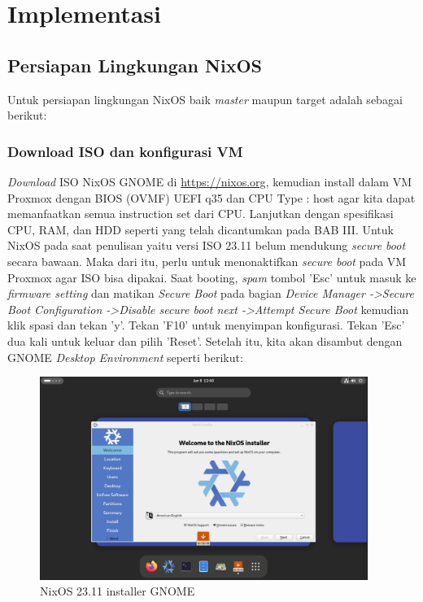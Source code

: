 \documentclass[10pt,twoside]{report}
\begin{document}
\section{Implementasi}
\begin{adjustwidth}{20pt}{}
	\subsection{Persiapan Lingkungan NixOS}
	\begin{adjustwidth}{20pt}{}
		Untuk persiapan lingkungan NixOS baik \textit{master} maupun target
		adalah sebagai berikut:
	\end{adjustwidth}
	\subsubsection{Download ISO dan konfigurasi VM}
	\begin{adjustwidth}{20pt}{}
		\textit{Download} ISO NixOS GNOME di \url{https://nixos.org}, kemudian
		install dalam VM Proxmox dengan BIOS (OVMF) UEFI q35 dan CPU Type : host
		agar kita dapat memanfaatkan semua instruction set dari CPU. Lanjutkan
		dengan spesifikasi CPU, RAM, dan HDD seperti yang telah dicantumkan pada
		BAB III. Untuk NixOS pada saat penulisan yaitu versi ISO 23.11 belum
		mendukung \textit{secure boot} secara bawaan. Maka dari itu, perlu untuk
		menonaktifkan \textit{secure boot} pada VM Proxmox agar ISO bisa dipakai.
		Saat booting, \textit{spam} tombol 'Esc' untuk masuk ke \textit{firmware setting} dan
		matikan \textit{Secure Boot} pada bagian \textit{Device Manager
			-\textgreater Secure Boot Configuration -\textgreater Disable secure boot
			next -\textgreater Attempt Secure Boot} kemudian klik spasi dan tekan 'y'.
		Tekan 'F10' untuk menyimpan konfigurasi. Tekan 'Esc' dua kali untuk keluar
		dan pilih 'Reset'. Setelah itu, kita akan disambut dengan GNOME
		\textit{Desktop Environment} seperti berikut:
		\begin{figure}[H]
			\begin{center}
				\includegraphics[width=0.95\textwidth]{images/nixos-23.11-installer.png}
			\end{center}
			\caption{NixOS 23.11 installer GNOME}
		\end{figure}
	\end{adjustwidth}

\end{adjustwidth}
\end{document}
